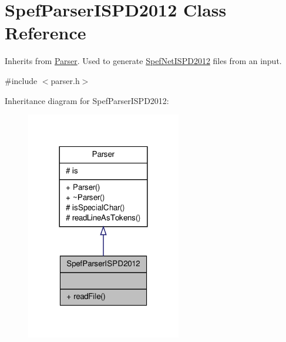 \hypertarget{classSpefParserISPD2012}{\section{Spef\-Parser\-I\-S\-P\-D2012 Class Reference}
\label{classSpefParserISPD2012}
}


Inherits from \hyperlink{classParser}{Parser}. Used to generate \hyperlink{classSpefNetISPD2012}{Spef\-Net\-I\-S\-P\-D2012} files from an input.  




{\ttfamily \#include $<$parser.\-h$>$}



Inheritance diagram for Spef\-Parser\-I\-S\-P\-D2012\-:\nopagebreak
\begin{figure}[H]
\begin{center}
\leavevmode
\includegraphics[width=192pt]{classSpefParserISPD2012__inherit__graph}
\end{center}
\end{figure}


